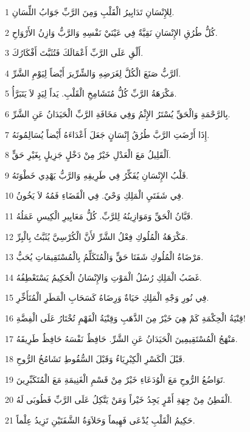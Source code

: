 \par 1 لِلإِنْسَانِ تَدَابِيرُ الْقَلْبِ وَمِنَ الرَّبِّ جَوَابُ اللِّسَانِ.
\par 2 كُلُّ طُرُقِ الإِنْسَانِ نَقِيَّةٌ فِي عَيْنَيْ نَفْسِهِ وَالرَّبُّ وَازِنُ الأَرْوَاحِ.
\par 3 أَلْقِ عَلَى الرَّبِّ أَعْمَالَكَ فَتُثَبَّتَ أَفْكَارُكَ.
\par 4 اَلرَّبُّ صَنَعَ الْكُلَّ لِغَرَضِهِ وَالشِّرِّيرَ أَيْضاً لِيَوْمِ الشَّرِّ.
\par 5 مَكْرَهَةُ الرَّبِّ كُلُّ مُتَشَامِخِ الْقَلْبِ. يَداً لِيَدٍ لاَ يَتَبَرَّأُ.
\par 6 بِالرَّحْمَةِ وَالْحَقِّ يُسْتَرُ الإِثْمُ وَفِي مَخَافَةِ الرَّبِّ الْحَيَدَانُ عَنِ الشَّرِّ.
\par 7 إِذَا أَرْضَتِ الرَّبَّ طُرُقُ إِنْسَانٍ جَعَلَ أَعْدَاءَهُ أَيْضاً يُسَالِمُونَهُ.
\par 8 اَلْقَلِيلُ مَعَ الْعَدْلِ خَيْرٌ مِنْ دَخْلٍ جَزِيلٍ بِغَيْرِ حَقٍّ.
\par 9 قَلْبُ الإِنْسَانِ يُفَكِّرُ فِي طَرِيقِهِ وَالرَّبُّ يَهْدِي خَطْوَتَهُ.
\par 10 فِي شَفَتَيِ الْمَلِكِ وَحْيٌ. فِي الْقَضَاءِ فَمُهُ لاَ يَخُونُ.
\par 11 قَبَّانُ الْحَقِّ وَمَوَازِينُهُ لِلرَّبِّ. كُلُّ مَعَايِيرِ الْكِيسِ عَمَلُهُ.
\par 12 مَكْرَهَةُ الْمُلُوكِ فِعْلُ الشَّرِّ لأَنَّ الْكُرْسِيَّ يُثَبَّتُ بِالْبِرِّ.
\par 13 مَرْضَاةُ الْمُلُوكِ شَفَتَا حَقٍّ وَالْمُتَكَلِّمُ بِالْمُسْتَقِيمَاتِ يُحَبُّ.
\par 14 غَضَبُ الْمَلِكِ رُسُلُ الْمَوْتِ وَالإِنْسَانُ الْحَكِيمُ يَسْتَعْطِفُهُ.
\par 15 فِي نُورِ وَجْهِ الْمَلِكِ حَيَاةٌ وَرِضَاهُ كَسَحَابِ الْمَطَرِ الْمُتَأَخِّرِ.
\par 16 قِنْيَةُ الْحِكْمَةِ كَمْ هِيَ خَيْرٌ مِنَ الذَّهَبِ وَقِنْيَةُ الْفَهْمِ تُخْتَارُ عَلَى الْفِضَّةِ!
\par 17 مَنْهَجُ الْمُسْتَقِيمِينَ الْحَيَدَانُ عَنِ الشَّرِّ. حَافِظٌ نَفْسَهُ حَافِظٌ طَرِيقَهُ.
\par 18 قَبْلَ الْكَسْرِ الْكِبْرِيَاءُ وَقَبْلَ السُّقُوطِ تَشَامُخُ الرُّوحِ.
\par 19 تَوَاضُعُ الرُّوحِ مَعَ الْوُدَعَاءِ خَيْرٌ مِنْ قَسْمِ الْغَنِيمَةِ مَعَ الْمُتَكَبِّرِينَ.
\par 20 الْفَطِنُ مِنْ جِهَةِ أَمْرٍ يَجِدُ خَيْراً وَمَنْ يَتَّكِلُ عَلَى الرَّبِّ فَطُوبَى لَهُ.
\par 21 حَكِيمُ الْقَلْبِ يُدْعَى فَهِيماً وَحَلاَوَةُ الشَّفَتَيْنِ تَزِيدُ عِلْماً.
